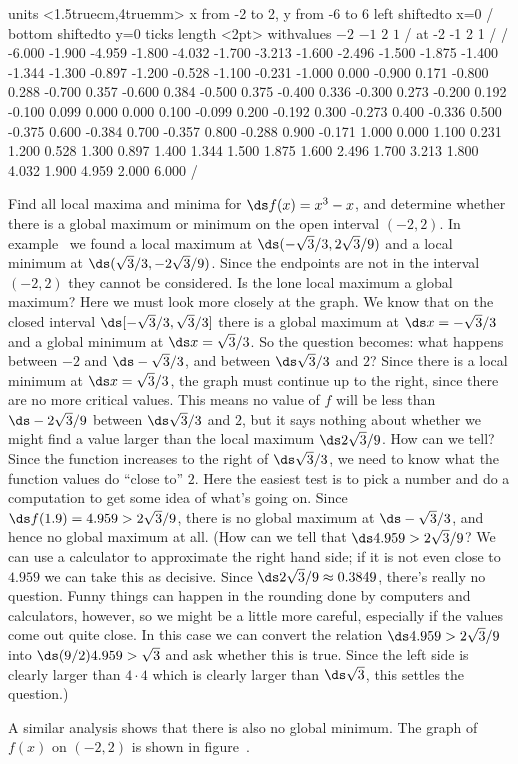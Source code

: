\figure
\vbox{\beginpicture
\normalgraphs
\ninepoint
\setcoordinatesystem units <1.5truecm,4truemm>
\setplotarea x from -2 to 2, y from -6 to 6
\axis left shiftedto x=0 /
\axis bottom shiftedto y=0 ticks length <2pt> withvalues {$-2$} {$-1$} {$2$}
      {$1$} / at -2 -1 2 1 / /
\setquadratic
{} -6.000 -1.900 -4.959 -1.800 -4.032 -1.700 -3.213 -1.600 -2.496 
-1.500 -1.875 -1.400 -1.344 -1.300 -0.897 -1.200 -0.528 -1.100 -0.231 
-1.000 0.000 -0.900 0.171 -0.800 0.288 -0.700 0.357 -0.600 0.384 
-0.500 0.375 -0.400 0.336 -0.300 0.273 -0.200 0.192 -0.100 0.099 
0.000 0.000 0.100 -0.099 0.200 -0.192 0.300 -0.273 0.400 -0.336 
0.500 -0.375 0.600 -0.384 0.700 -0.357 0.800 -0.288 0.900 -0.171 
1.000 0.000 1.100 0.231 1.200 0.528 1.300 0.897 1.400 1.344 
1.500 1.875 1.600 2.496 1.700 3.213 1.800 4.032 1.900 4.959 
2.000 6.000  /
\endpicture}

\begin{example}
Find all local maxima and minima for $\ds f(x)=x^3-x$, and determine whether
there is a global maximum or minimum on the open interval 
$(-2,2)$. In example~ we found a local maximum at $\ds (-\sqrt3/3,2\sqrt{3}/9)$ and a
local minimum at $\ds (\sqrt3/3,-2\sqrt{3}/9)$. Since the endpoints are
not in the interval $(-2,2)$ they cannot be considered.
Is the lone local maximum
a global maximum? Here we must look more closely at the graph. 
We know that on the closed interval $\ds [-\sqrt3/3,\sqrt3/3]$ there is a
global maximum at $\ds x=-\sqrt3/3$ and a global minimum at $\ds x=\sqrt3/3$.
So the question becomes: what happens between $-2$ and $\ds -\sqrt3/3$, and between
$\ds \sqrt3/3$ and $2$? Since there is a local minimum at $\ds x=\sqrt3/3$,
the graph must continue up to the right, since there are no more
critical values. This means no value of $f$ will be less than 
$\ds -2\sqrt{3}/9$ between $\ds \sqrt3/3$ and $2$, but it says nothing about
whether we might find a value larger than the local maximum
$\ds 2\sqrt{3}/9$.
How can we tell? Since the function increases to the right of
$\ds \sqrt3/3$, we need to know what the function values do ``close to''
$2$. Here the easiest test is to pick a number and do a computation to
get some idea of what's going on. Since $\ds f(1.9)=4.959>2\sqrt{3}/9$,
there is no global maximum at $\ds -\sqrt3/3$, and hence no global maximum
at all. (How can we tell that $\ds 4.959>2\sqrt{3}/9$? We can use a
calculator to approximate the right hand side; if it is not even close
to $4.959$ we can take this as decisive. Since 
$\ds 2\sqrt{3}/9\approx 0.3849$, there's really no question.
Funny things can happen in
the rounding done by computers and calculators, however, so we might
be a little more careful, especially if the values come out quite
close.
In this case we can convert the relation $\ds 4.959>2\sqrt{3}/9$ into 
$\ds (9/2) 4.959>\sqrt{3}$ and ask whether this is true. Since the left side
is clearly larger than $4\cdot 4$ which is clearly larger than
$\ds \sqrt3$, this settles the question.)

A similar analysis shows that there is also no global minimum.
The
graph of $f(x)$ on $(-2,2)$ is shown in 
figure~.
\end{example}

